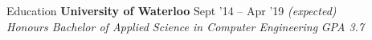 \documentclass{resume} %
\begin{document}

\begin{rSection}{Education}
  {\bf University of Waterloo} \hfill {Sept '14 -- Apr '19 \em (expected)} \\
  {\em Honours Bachelor of Applied Science in Computer Engineering} \hfill {\em GPA 3.7}
  \vspace{0.5em}
\end{rSection}
\end{document}
